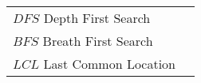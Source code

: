 \begin{longtable}{ll}
$DFS$ Depth First Search \\
$BFS$ Breath First Search \\
$LCL$ Last Common Location \\
\end{longtable}